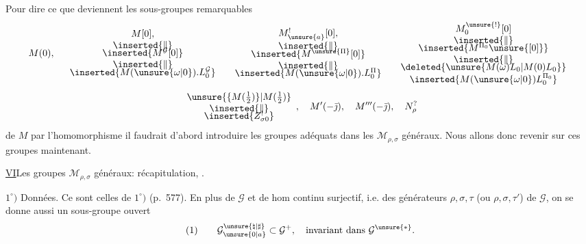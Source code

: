 Pour dire ce que deviennent les sous-groupes remarquables
\[
M(0),\quad
\begin{array}{c}
M[0],\\
\inserted{\Vert}\\[-4pt]
\inserted{M^{\mathcal{G}}[0]}\\
\inserted{\Vert}\\[-4pt]
\inserted{M(\unsure{\omega|0}).L_{0}^{\mathcal{G}}}
\end{array}
\quad
\begin{array}{c}
M_{\unsure{a}}^{!}[0],\\
\inserted{\Vert}\\[-4pt]
\inserted{M^{\unsure{\Pi}}[0]}\\
\inserted{\Vert}\\[-4pt]
\inserted{M(\unsure{\omega|0}).L_{0}^{\Pi}}
\end{array}
\quad
\begin{array}{c}
M_{0}^{\unsure{!}}[0]\\
\inserted{\Vert}\\[-4pt]
\inserted{M^{\Pi_{0}}\unsure{[0]}}\\
\inserted{\Vert}\\[-4pt]
\deleted{\unsure{M(\omega)L_{0}|M(0)L_{0}}}\\
\inserted{M(\unsure{\omega|0})L_{0}^{\Pi_{0}}}
\end{array}
\]
\[
\begin{array}{c}
\unsure{\{M(\tfrac12)\}|M(\tfrac12)}\\
\inserted{\Vert}\\[-4pt]
\inserted{Z_{\sigma0}^{!}}
\end{array},\quad
M'(-\bar{\jmath}),\quad M'''(-\bar{\jmath}),\quad N_{\rho}^{?}
\]
de $M$ par l'homomorphisme
il faudrait d'abord introduire les groupes adéquats dans les $\mathcal{M}_{\rho,\sigma}$
généraux. Nous allons donc revenir sur ces groupes maintenant.



\uline{VI}\quad Les groupes $\mathcal{M}_{\rho,\sigma}$ généraux:
récapitulation, .

$1^\circ)$ Données. Ce sont celles de \uline{} $1^\circ)$ (p.~577).
En plus de $\mathcal{G}$  et de
hom continu surjectif, i.e. des générateurs $\rho,\sigma,\tau$
(ou $\rho,\sigma,\tau'$) de $\mathcal{G}$, on se donne aussi un sous-groupe ouvert
\[
(1)\qquad \mathcal{G}_{\unsure{0|a}}^{\unsure{\natural|\sharp}}
\subset\mathcal{G}^{+},\quad
\text{invariant dans }\mathcal{G}^{\unsure{*}}.
\]

